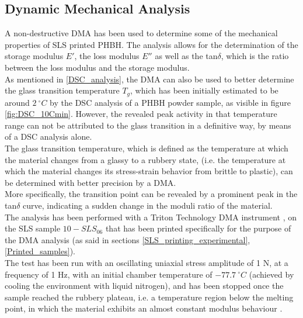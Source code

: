 \documentclass{article}
\begin{document}
          
  
        \clearpage

      \subsection{Dynamic Mechanical Analysis\label{DMA}}
 
        A non-destructive DMA has been used to determine some of the mechanical properties of SLS printed PHBH. The analysis 
        allows for the determination of the storage modulus $E'$, the loss modulus $E''$ as well as the tan$\delta$, 
        which is the ratio between the loss modulus and the storage modulus. \\ 
        As mentioned in \ref{DSC_analysis}, the DMA can also be used to better determine the glass transition temperature $T_g$, which 
        has been initially estimated to be around $2 \ ^{\circ}C$ by the DSC analysis of a PHBH powder sample, as visible in figure \ref{fig:DSC_10Cmin}. 
        However, the revealed 
        peak activity in that temperature range can not be attributed to the glass transition in a definitive way, by means of a DSC analysis 
        alone. \\ 

        The glass transition temperature, which is defined as the temperature at which the material changes from a glassy to a rubbery state, 
        (i.e. the temperature at which the material changes its stress-strain behavior from brittle to plastic), can be determined with 
        better precision by a DMA. \\ 

        More specifically, the transition point can be revealed by a prominent peak in the tan$\delta$ curve, indicating a 
        sudden change in the moduli ratio of the material. \\ 
        
        The analysis has been performed with a Triton Technology DMA instrument \autocites{Triton_Technology_Ltd}, on the SLS sample 
        $10-SLS_{06}$ that has been printed specifically for the purpose of the DMA analysis 
        (as said in sections \ref{SLS_printing_experimental}, \ref{Printed_samples}). \\ 

        The test has been run with an oscillating uniaxial stress amplitude of 1 N, at a frequency of 1 Hz, with an initial 
        chamber temperature of $- 77.7 \ ^{\circ}C$ (achieved by cooling the environment with liquid nitrogen), and has been stopped 
        once the sample reached the rubbery plateau, i.e. a temperature region below the melting point, in which the material 
        exhibits an almost constant modulus behaviour \autocites{JD_Ferry_viscoelasticpolymers}. \\
\end{document}
